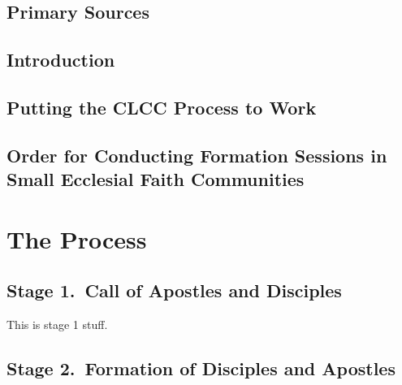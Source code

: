\documentclass[oneside]{book}
\begin{document}

\tableofcontents


\chapter{Primary Sources}


\chapter{Introduction}


\chapter{Putting the CLCC Process to Work}


\chapter{Order for Conducting Formation Sessions in Small Ecclesial Faith
Communities}


\mainmatter
\part{The Process}


\chapter{Stage 1.\ Call of Apostles and Disciples}

This is stage 1 stuff.


\chapter{Stage 2.\ Formation of Disciples and Apostles}
\end{document}
